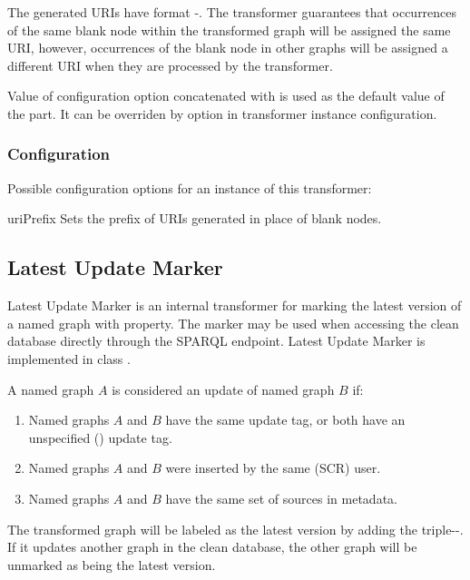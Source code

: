 The generated URIs have format {-}. The transformer guarantees that occurrences of the same blank node within the transformed graph
 will be assigned the same URI, however, occurrences of the blank node in other graphs will be assigned a different URI when they are processed by the transformer.

Value of  configuration option concatenated with  is used as the default value of the  part. It can be overriden by  option in transformer instance configuration.

\subsubsection{Configuration}
Possible configuration options for an instance of this transformer:
\begin{configlist}
	\item[uriPrefix] Sets the prefix of URIs generated in place of blank nodes.
\end{configlist}

\subsection{Latest Update Marker}
\label{sec:latestUpdateMarker}
Latest Update Marker is an internal transformer for marking the latest version of a named graph with  property. The marker may be used when accessing the clean database directly through the SPARQL endpoint. Latest Update Marker is implemented in class .

A named graph $A$ is considered an update of named graph $B$ if:
\begin{enumerate}
		\item Named graphs $A$ and $B$ have the same update tag, or both have an unspecified () update tag.
	  \item Named graphs $A$ and $B$ were inserted by the same (SCR) user.
	  \item Named graphs $A$ and $B$ have the same set of sources in metadata.
\end{enumerate}

The transformed graph will be labeled as the latest version by adding  the triple\linebreak {}--. If it updates another graph in the clean database, the other graph will be unmarked as being the latest version.

